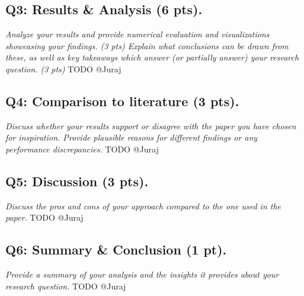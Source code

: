 \subsection*{Q3: Results \& Analysis (6 pts).}
\textit{ Analyze your results and provide numerical evaluation and visualizations showcasing your findings. (3 pts) Explain what conclusions can be drawn from these, as well as key takeaways which answer (or partially answer) your research question. (3 pts)}
TODO @Juraj


\subsection*{Q4: Comparison to literature (3 pts).}
\textit{ Discuss whether your results support or disagree with the paper you have chosen for inspiration. Provide plausible reasons for different findings or any performance discrepancies.}
TODO @Juraj


\subsection*{Q5: Discussion (3 pts).}
\textit{ Discuss the pros and cons of your approach compared to the one used in the paper.}
TODO @Juraj


\subsection*{Q6: Summary \& Conclusion (1 pt).}
\textit{ Provide a summary of your analysis and the insights it provides about your research question.}
TODO @Juraj
